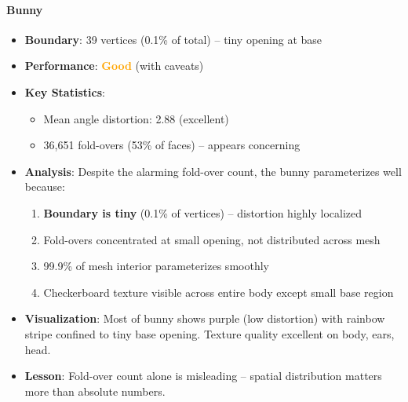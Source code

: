 \documentclass[11pt]{article}
\begin{document}
\paragraph{Bunny}
\begin{itemize}
    \item \textbf{Boundary}: 39 vertices (0.1\% of total) -- tiny opening at base
    \item \textbf{Performance}: \textcolor{orange}{\textbf{Good}} (with caveats)
    \item \textbf{Key Statistics}:
    \begin{itemize}
        \item Mean angle distortion: 2.88 (excellent)
        \item 36,651 fold-overs (53\% of faces) -- appears concerning
    \end{itemize}
    \item \textbf{Analysis}: Despite the alarming fold-over count, the bunny parameterizes well because:
    \begin{enumerate}
        \item \textbf{Boundary is tiny} (0.1\% of vertices) -- distortion highly localized
        \item Fold-overs concentrated at small opening, not distributed across mesh
        \item 99.9\% of mesh interior parameterizes smoothly
        \item Checkerboard texture visible across entire body except small base region
    \end{enumerate}
    \item \textbf{Visualization}: Most of bunny shows purple (low distortion) with rainbow stripe confined to tiny base opening. Texture quality excellent on body, ears, head.
    \item \textbf{Lesson}: Fold-over count alone is misleading -- spatial distribution matters more than absolute numbers.
\end{itemize}
\end{document}
